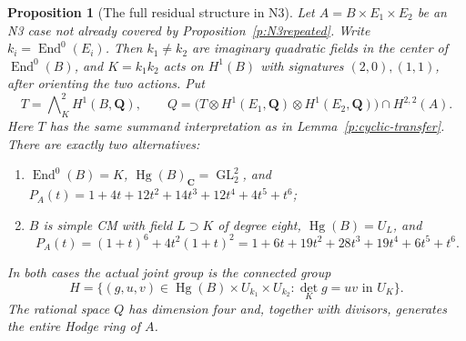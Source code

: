 \documentclass[11pt,reqno]{article}
\theoremstyle{emphasizedplain}
\newtheorem{proposition}[theorem]{Proposition}
\theoremstyle{emphasizeddefinition}
\theoremstyle{emphasizeddefinition}
\DeclareMathOperator{\End}{End}
\DeclareMathOperator{\Hg}{Hg}
\DeclareMathOperator{\GL}{GL}
\newcommand{\Q}{\mathbf Q}
\newcommand{\C}{\mathbf C}
\begin{document}
\begin{proposition}[The full residual structure in N3]\label{p:N3residual}
Let $A=B\times E_1\times E_2$ be an N3 case not already covered
by Proposition~\ref{p:N3repeated}. Write $k_i=\End^0(E_i)$.
Then $k_1\ne k_2$ are imaginary quadratic fields in the center
of $\End^0(B)$, and $K=k_1k_2$ acts on $H^1(B)$ with signatures
$(2,0),(1,1)$, after orienting the two actions. Put
\[
 T=\bigwedge\nolimits_K^2 H^1(B,\Q),\qquad
 Q=\bigl(T\otimes H^1(E_1,\Q)\otimes H^1(E_2,\Q)\bigr)
       \cap H^{2,2}(A).
\]
Here $T$ has the same summand interpretation as in
Lemma~\ref{p:cyclic-transfer}. There are exactly two alternatives:
\begin{enumerate}
\item $\End^0(B)=K$, $\Hg(B)_\C=\GL_2^2$, and
$P_A(t)=1+4t+12t^2+14t^3+12t^4+4t^5+t^6$;
\item $B$ is simple CM with field $L\supset K$ of degree eight,
$\Hg(B)=U_L$, and
\[
 P_A(t)=(1+t)^6+4t^2(1+t)^2
 =1+6t+19t^2+28t^3+19t^4+6t^5+t^6.
\]
\end{enumerate}
In both cases the actual joint group is the connected group
\[
 H=\{(g,u,v)\in\Hg(B)\times U_{k_1}\times U_{k_2}:
                         \det_K g=uv\text{ in }U_K\}.
\]
The rational space $Q$ has dimension four and, together with
divisors, generates the entire Hodge ring of $A$.
\end{proposition}
\end{document}
